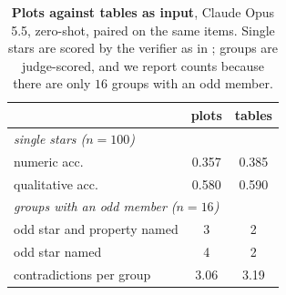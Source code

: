 \begin{table}[h]\centering\small
\caption{\textbf{Plots against tables as input}, Claude Opus 5.5, zero-shot, paired on the
same items. Single stars are scored by the verifier as in ; groups are
judge-scored, and we report counts because there are only $16$ groups with an odd member.}
\label{tab:frontierinput}
\begin{tabular}{lcc}
\toprule
 & plots & tables \\
\midrule
\multicolumn{3}{l}{\emph{single stars ($n=100$)}}\\
numeric acc.     & 0.357 & 0.385 \\
qualitative acc. & 0.580 & 0.590 \\
\midrule
\multicolumn{3}{l}{\emph{groups with an odd member ($n=16$)}}\\
odd star and property named & 3 & 2 \\
odd star named              & 4 & 2 \\
contradictions per group    & 3.06 & 3.19 \\
\bottomrule
\end{tabular}
\end{table}
